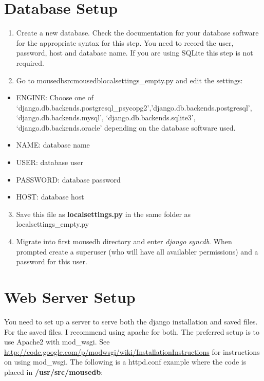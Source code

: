 \documentclass[letterpaper,10pt,english]{sphinxmanual}
\begin{document}
\section{Database Setup}
\label{installation:database-setup}\begin{enumerate}
\item {} 
Create a new database.  Check the documentation for your database software for the appropriate syntax for this step.  You need to record the user, password, host and database name.  If you are using SQLite this step is not required.

\item {} 
Go to mousedbsrcmousedblocalsettings\_empty.py and edit the settings:

\end{enumerate}
\begin{itemize}
\item {} 
ENGINE: Choose one of `django.db.backends.postgresql\_psycopg2','django.db.backends.postgresql', `django.db.backends.mysql', `django.db.backends.sqlite3', `django.db.backends.oracle' depending on the database software used.

\item {} 
NAME: database name

\item {} 
USER: database user

\item {} 
PASSWORD: database password

\item {} 
HOST: database host

\end{itemize}
\begin{enumerate}
\setcounter{enumi}{2}
\item {} 
Save this file as \textbf{localsettings.py} in the same folder as localsettings\_empty.py

\item {} 
Migrate into first mousedb directory and enter \emph{django syncdb}.  When prompted create a superuser (who will have all availabler permissions) and a password for this user.

\end{enumerate}


\section{Web Server Setup}
\label{installation:web-server-setup}
You need to set up a server to serve both the django installation and saved files.  For the saved files.  I recommend using apache for both.  The preferred setup is to use Apache2 with mod\_wsgi.  See \href{http://code.google.com/p/modwsgi/wiki/InstallationInstructions}{http://code.google.com/p/modwsgi/wiki/InstallationInstructions} for instructions on using mod\_wsgi.  The following is a httpd.conf example where the code is placed in \textbf{/usr/src/mousedb}:
\end{document}
